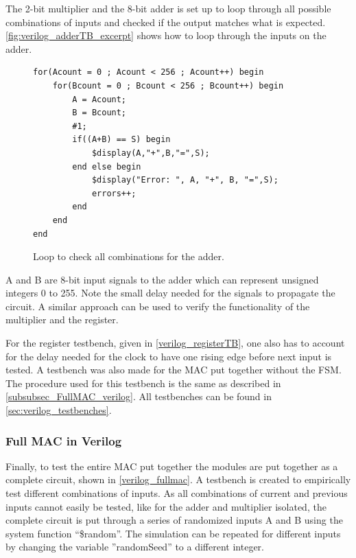 The 2-bit multiplier and the 8-bit adder is set up to loop through all possible combinations of inputs and checked if the output matches what is expected. \autoref{fig:verilog_adderTB_excerpt} shows how to loop through the inputs on the adder.

\begin{figure}[H]
\centering
\begin{minipage}{0.8\textwidth}
\begin{lstlisting}[style=verilogStyle]
for(Acount = 0 ; Acount < 256 ; Acount++) begin
    for(Bcount = 0 ; Bcount < 256 ; Bcount++) begin
        A = Acount;
        B = Bcount;
        #1;
        if((A+B) == S) begin
            $display(A,"+",B,"=",S);
        end else begin
            $display("Error: ", A, "+", B, "=",S);
            errors++;
        end
    end
end
\end{lstlisting}
\end{minipage}
\caption{Loop to check all combinations for the adder.}
\label{fig:verilog_adderTB_excerpt}
\end{figure}

A and B are 8-bit input signals to the adder which can represent unsigned integers 0 to 255. Note the small delay needed for the signals to propagate the circuit. A similar approach can be used to verify the functionality of the multiplier and the register. 

For the register testbench, given in \autoref{verilog_registerTB}, one also has to account for the delay needed for the clock to have one rising edge before next input is tested. A testbench was also made for the MAC put together without the FSM. The procedure used for this testbench is the same as described in \autoref{subsubsec_FullMAC_verilog}. All testbenches can be found in \autoref{sec:verilog_testbenches}.

\subsubsection{Full MAC in Verilog}
\label{subsubsec_FullMAC_verilog}

Finally, to test the entire MAC put together the modules are put together as a complete circuit, shown in \autoref{verilog_fullmac}. A testbench is created to empirically test different combinations of inputs. As all combinations of current and previous inputs cannot easily be tested, like for the adder and multiplier isolated, the complete circuit is put through a series of randomized inputs A and B using the system function ``\$random''. The simulation can be repeated for different inputs by changing the variable ''randomSeed'' to a different integer.

